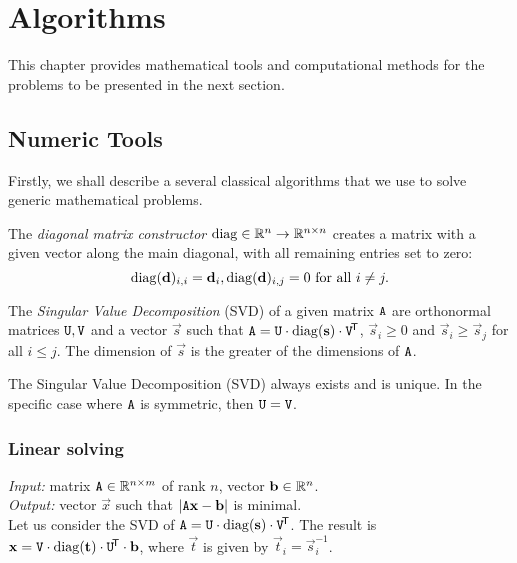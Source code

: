 \chapter{Algorithms}
\label{s:algo}
This chapter provides mathematical tools and computational methods for the problems to be presented in the next section.

\section{Numeric Tools}

Firstly, we shall describe a several classical algorithms that we use to solve generic mathematical problems.

\begin{definition}
The \textit{diagonal matrix constructor} $\mathrm{diag} \in \mathbb{R}^n \to \mathbb{R}^{n\times n}$ creates a matrix with a given vector along the main diagonal, with all remaining entries set to zero:
$$\mathrm{diag}(\mathbf{d})_{i, i} = \mathbf{d}_i, \mathrm{diag}(\mathbf{d})_{i,j} = 0 \textrm{ for all } i \neq j.$$
\end{definition}

\begin{definition}
The \textit{Singular Value Decomposition} (SVD) of a given matrix $\mathtt{A}$ are orthonormal matrices $\mathtt{U}, \mathtt{V}$ and a vector $\vec s$ such that $\mathtt{A} = \mathtt{U} \cdot \mathrm{diag}(\mathbf{s}) \cdot \mathtt{V}^{\!\mathsf{T}}$, $\vec s_i \geq 0$ and $\vec s_i \geq \vec s_j$ for all $i \leq j$.
The dimension of $\vec s$ is the greater of the dimensions of $\mathtt{A}$.
\end{definition}

\begin{claim}
The Singular Value Decomposition (SVD) always exists and is unique.
In the specific case where $\mathtt{A}$ is symmetric, then $\mathtt{U} = \mathtt{V}$.
\end{claim}

\subsection{Linear solving}
\textit{Input:} matrix $\mathtt{A} \in \mathbb{R}^{n \times m}$ of rank $n$, vector $\mathbf{b} \in \mathbb{R}^n$.\\
\textit{Output:} vector $\vec x$ such that $|\mathtt{A} \mathbf{x} - \mathbf{b}|$ is minimal.\\

Let us consider the SVD of $\mathtt{A} = \mathtt{U} \cdot \mathrm{diag}(\mathbf{s}) \cdot \mathtt{V}^{\!\mathsf{T}}$.
The result is $\mathbf{x} = \mathtt{V} \cdot \mathrm{diag}(\mathbf{t}) \cdot \mathtt{U}^{\!\mathsf{T}} \cdot \mathbf{b}$, where $\vec t$ is given by $\vec t_i = \vec s_i ^{-1}$.

